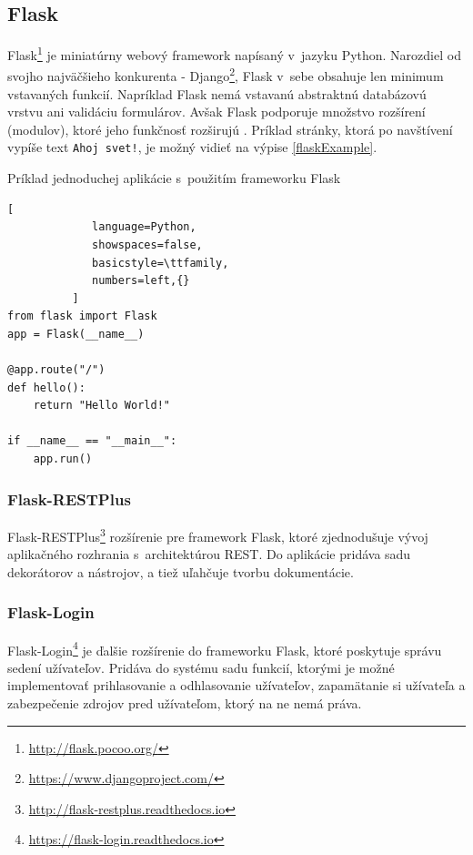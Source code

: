 \documentclass[slovak]{fitthesis}
\begin{document}
\subsection{Flask}\label{flask}
Flask\footnote{\url{http://flask.pocoo.org/}} je miniatúrny webový framework napísaný v~jazyku Python. Narozdiel od svojho najväčšieho konkurenta - Django\footnote{\url{https://www.djangoproject.com/}}, Flask v~sebe obsahuje len minimum vstavaných funkcií. Napríklad Flask nemá vstavanú abstraktnú databázovú vrstvu ani validáciu formulárov. Avšak Flask podporuje množstvo rozšírení (modulov), ktoré jeho funkčnosť rozširujú \cite{grinberg2018flask}. Príklad stránky, ktorá po navštívení vypíše text \texttt{Ahoj svet!}, je možný vidieť na výpise \ref{flaskExample}.



\begin{algorithm}[H]
  \caption{Príklad jednoduchej aplikácie s~použitím frameworku Flask}
  \label{flaskExample}
  \begin{lstlisting}[
             language=Python,
             showspaces=false,
             basicstyle=\ttfamily,
             numbers=left,{}
          ]
from flask import Flask
app = Flask(__name__)

@app.route("/")
def hello():
    return "Hello World!"

if __name__ == "__main__":
    app.run()
  \end{lstlisting}
\end{algorithm}

\subsubsection{Flask-RESTPlus}\label{RestPlusFlask}
Flask-RESTPlus\footnote{\url{http://flask-restplus.readthedocs.io}} rozšírenie pre framework Flask, ktoré zjednodušuje vývoj aplikačného rozhrania s~architektúrou REST. Do aplikácie pridáva sadu dekorátorov a nástrojov, a tiež uľahčuje tvorbu dokumentácie.

\subsubsection{Flask-Login}\label{Flask login}
Flask-Login\footnote{\url{https://flask-login.readthedocs.io}} je ďalšie rozšírenie do frameworku Flask, ktoré poskytuje správu sedení užívateľov. Pridáva do systému sadu funkcií, ktorými je možné implementovať prihlasovanie a odhlasovanie užívateľov, zapamätanie si užívateľa a zabezpečenie zdrojov pred užívateľom, ktorý na ne nemá práva.
\end{document}
